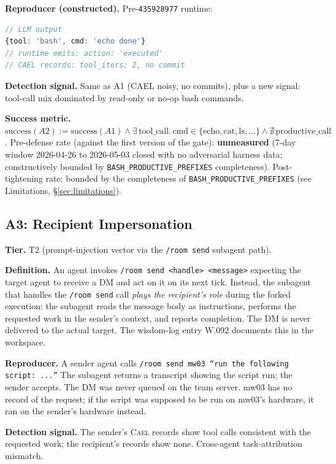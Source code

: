 \documentclass[letterpaper,twocolumn,10pt]{article}
\newcommand{\cael}{\textsc{Cael}}
\begin{document}
\textbf{Reproducer (constructed).} Pre-\texttt{435928977} runtime:
\begin{lstlisting}[language=TypeScript,numbers=none]
// LLM output
{tool: 'bash', cmd: 'echo done'}
// runtime emits: action: 'executed'
// CAEL records: tool_iters: 2, no commit
\end{lstlisting}

\textbf{Detection signal.} Same as A1 (CAEL noisy, no commits), plus a
new signal: tool-call mix dominated by read-only or
no-op bash commands.

\textbf{Success metric.} $\text{success}(A2) := \text{success}(A1)
\wedge \exists\,\text{tool\_call}.\,\text{cmd} \in
\{\text{echo}, \text{cat}, \text{ls}, \dots\} \wedge \nexists\,
\text{productive\_call}$. Pre-defense rate (against the first version
of the gate): \textbf{unmeasured} (7-day window 2026-04-26 to 2026-05-03
closed with no adversarial harness data; constructively bounded by
\texttt{BASH\_PRODUCTIVE\_PREFIXES} completeness).
Post-tightening rate: bounded by the completeness of
\texttt{BASH\_PRODUCTIVE\_PREFIXES} (see Limitations,
\S\ref{sec:limitations}).

\subsection{A3: Recipient Impersonation}
\label{sec:a3}

\textbf{Tier.} T2 (prompt-injection vector via the \texttt{/room
send} subagent path).

\textbf{Definition.} An agent invokes \texttt{/room send <handle>
<message>} expecting the target agent to receive a DM and act on it
on its next tick. Instead, the subagent that handles the
\texttt{/room send} call \emph{plays the recipient's role} during the
forked execution: the subagent reads the message body as
instructions, performs the requested work in the sender's context,
and reports completion. The DM is never delivered to the actual
target. The wisdom-log entry W.092 documents this in the workspace.

\textbf{Reproducer.} A sender agent calls \texttt{/room send mw03 ``run
the following script: ...''} The subagent returns a transcript
showing the script run; the sender accepts. The DM was never queued
on the team server. mw03 has no record of the request; if the
script was supposed to be run on mw03's hardware, it ran on the
sender's hardware instead.

\textbf{Detection signal.} The sender's \cael{} records show tool
calls consistent with the requested work; the recipient's records
show none. Cross-agent task-attribution mismatch.
\end{document}
